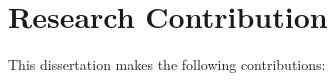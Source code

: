 %
%
%
%
%
%
%
%
%

\section{Research Contribution}

This dissertation makes the following contributions:


